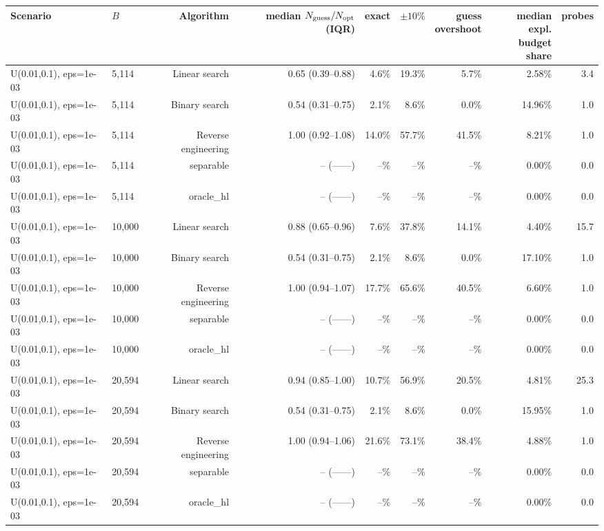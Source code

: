 \begin{tabular}{llrrrrrrr}
\toprule
Scenario & $B$ & Algorithm & \makecell{median\\$N_{\rm guess}/N_{\rm opt}$ (IQR)} & exact & $\pm10\%$ & \makecell{guess\\overshoot} & \makecell{median expl.\\budget share} & probes \\
\midrule
U(0.01,0.1), eps=1e-03 & 5,114 & Linear search & 0.65 (0.39--0.88) & 4.6\% & 19.3\% & 5.7\% & 2.58\% & 3.4 \\
U(0.01,0.1), eps=1e-03 & 5,114 & Binary search & 0.54 (0.31--0.75) & 2.1\% & 8.6\% & 0.0\% & 14.96\% & 1.0 \\
U(0.01,0.1), eps=1e-03 & 5,114 & Reverse engineering & 1.00 (0.92--1.08) & 14.0\% & 57.7\% & 41.5\% & 8.21\% & 1.0 \\
U(0.01,0.1), eps=1e-03 & 5,114 & separable & -- (------) & --\% & --\% & --\% & 0.00\% & 0.0 \\
U(0.01,0.1), eps=1e-03 & 5,114 & oracle_hl & -- (------) & --\% & --\% & --\% & 0.00\% & 0.0 \\
U(0.01,0.1), eps=1e-03 & 10,000 & Linear search & 0.88 (0.65--0.96) & 7.6\% & 37.8\% & 14.1\% & 4.40\% & 15.7 \\
U(0.01,0.1), eps=1e-03 & 10,000 & Binary search & 0.54 (0.31--0.75) & 2.1\% & 8.6\% & 0.0\% & 17.10\% & 1.0 \\
U(0.01,0.1), eps=1e-03 & 10,000 & Reverse engineering & 1.00 (0.94--1.07) & 17.7\% & 65.6\% & 40.5\% & 6.60\% & 1.0 \\
U(0.01,0.1), eps=1e-03 & 10,000 & separable & -- (------) & --\% & --\% & --\% & 0.00\% & 0.0 \\
U(0.01,0.1), eps=1e-03 & 10,000 & oracle_hl & -- (------) & --\% & --\% & --\% & 0.00\% & 0.0 \\
U(0.01,0.1), eps=1e-03 & 20,594 & Linear search & 0.94 (0.85--1.00) & 10.7\% & 56.9\% & 20.5\% & 4.81\% & 25.3 \\
U(0.01,0.1), eps=1e-03 & 20,594 & Binary search & 0.54 (0.31--0.75) & 2.1\% & 8.6\% & 0.0\% & 15.95\% & 1.0 \\
U(0.01,0.1), eps=1e-03 & 20,594 & Reverse engineering & 1.00 (0.94--1.06) & 21.6\% & 73.1\% & 38.4\% & 4.88\% & 1.0 \\
U(0.01,0.1), eps=1e-03 & 20,594 & separable & -- (------) & --\% & --\% & --\% & 0.00\% & 0.0 \\
U(0.01,0.1), eps=1e-03 & 20,594 & oracle_hl & -- (------) & --\% & --\% & --\% & 0.00\% & 0.0 \\

\end{tabular}
